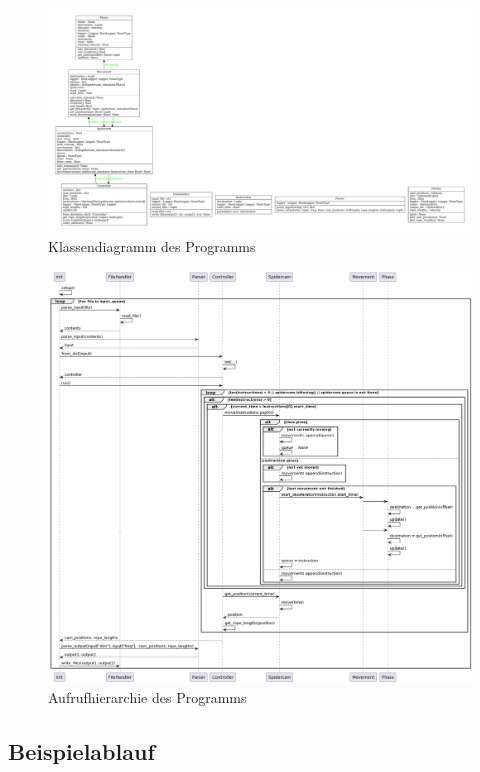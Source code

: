 \begin{figure}[H]
    \centering
    \includegraphics[width=.7\textwidth]{../python/uml/classes.pdf}
    \caption{Klassendiagramm des Programms}
    \label{fig:classes}
\end{figure}

\begin{figure}[H]
    \centering
    \includegraphics[width=\textwidth]{../python/uml/sequence.png}
    \caption{Aufrufhierarchie des Programms}
    \label{fig:sequence}
\end{figure}

\subsection{Beispielablauf}
\label{sssec:beispielablauf}

